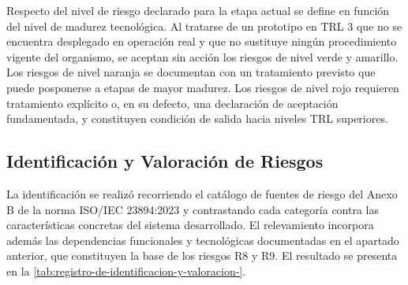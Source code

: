 
Respecto del nivel de riesgo declarado para la etapa actual se define en función del nivel de madurez tecnológica. Al tratarse de un prototipo en TRL 3 que no se encuentra desplegado en operación real y que no sustituye ningún procedimiento vigente del organismo, se aceptan sin acción los riesgos de nivel verde y amarillo. Los riesgos de nivel naranja se documentan con un tratamiento previsto que puede posponerse a etapas de mayor madurez. Los riesgos de nivel rojo requieren tratamiento explícito o, en su defecto, una declaración de aceptación fundamentada, y constituyen condición de salida hacia niveles TRL superiores.

\subsection{Identificación y Valoración de Riesgos}\label{identificaciuxf3n-y-valoraciuxf3n-de-riesgos}\label{identificacion-y-valoracion-de-riesgos}

La identificación se realizó recorriendo el catálogo de fuentes de riesgo del Anexo B de la norma ISO/IEC 23894:2023 y contrastando cada categoría contra las características concretas del sistema desarrollado. El relevamiento incorpora además las dependencias funcionales y tecnológicas documentadas en el apartado anterior, que constituyen la base de los riesgos R8 y R9. El resultado se presenta en la \cref{tab:registro-de-identificacion-y-valoracion-}.

